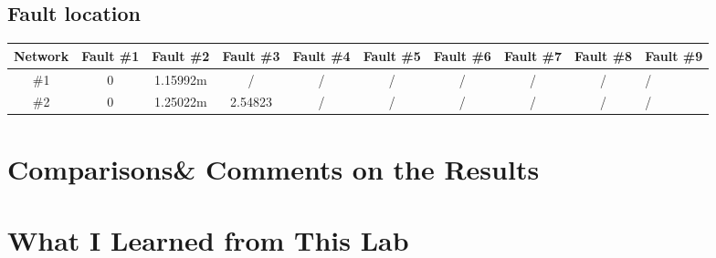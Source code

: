 \documentclass[11pt,oneside,a4paper]{report}
\begin{document}
\subsection*{Fault location}
\begin{table}[htbp]
\begin{tabular}{ccccccccc}
\toprule
Network & Fault \#1 & Fault \#2 & Fault \#3 & Fault \#4 & Fault \#5 & Fault \#6 & Fault \#7 & Fault \#8 & Fault \#9 \\
\midrule
\#1 & 0 & 1.15992m & / & / & / & / & / & / & / \\
\#2 & 0 & 1.25022m & 2.54823 & / & / & / & / & / & / \\
\bottomrule
\end{tabular}
\end{table}

\section*{Comparisons\& Comments on the Results}

\section*{What I Learned from This Lab}
\end{document}
